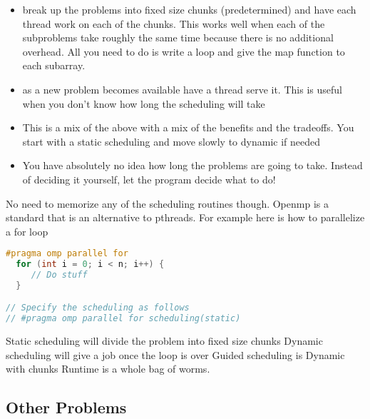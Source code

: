 \begin{itemize}
\item {} break up the problems into fixed size chunks (predetermined) and have each thread work on each of the chunks.
  This works well when each of the subproblems take roughly the same time because there is no additional overhead.
  All you need to do is write a loop and give the map function to each subarray.
\item {} as a new problem becomes available have a thread serve it.
  This is useful when you don't know how long the scheduling will take
\item {} This is a mix of the above with a mix of the benefits and the tradeoffs.
  You start with a static scheduling and move slowly to dynamic if needed
\item {} You have absolutely no idea how long the problems are going to take.
  Instead of deciding it yourself, let the program decide what to do!
\end{itemize}

No need to memorize any of the scheduling routines though.
Openmp is a standard that is an alternative to pthreads.
For example here is how to parallelize a for loop

\begin{lstlisting}[language=C]
#pragma omp parallel for
  for (int i = 0; i < n; i++) {
     // Do stuff
  }

// Specify the scheduling as follows
// #pragma omp parallel for scheduling(static)
\end{lstlisting}

Static scheduling will divide the problem into fixed size chunks
Dynamic scheduling will give a job once the loop is over
Guided scheduling is Dynamic with chunks
Runtime is a whole bag of worms.

\subsection{Other Problems}


